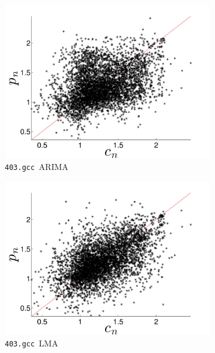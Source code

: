 \documentclass{article}
\newcommand{\gcc}{{\tt 403.gcc}~}
\begin{document}
\begin{figure}[htbp]
  \centering
       
  \begin{subfigure}{0.5\textwidth}
    \includegraphics[width=\textwidth]{figs/gccARIMAForecast}
    \caption{\gcc ARIMA }
    \label{fig:gccARIMA}
  \end{subfigure}%
    \begin{subfigure}{0.5\textwidth}
    \includegraphics[width=\textwidth]{figs/gccLMAForecast}
    \caption{\gcc LMA}
    \label{fig:gccLMA}
  \end{subfigure}
  \\
  \begin{subfigure}{0.49\textwidth}

\end{subfigure}
\end{figure}
\end{document}
